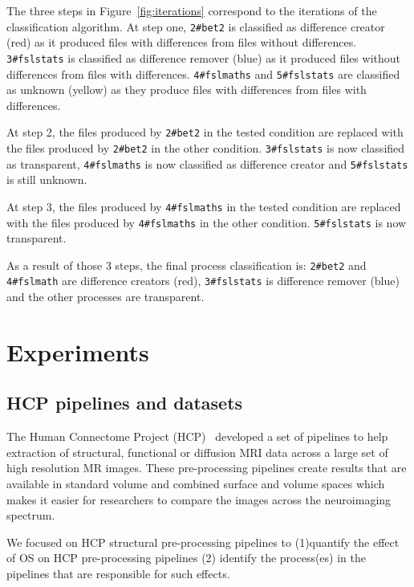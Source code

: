 \documentclass[a4paper,num-refs]{oup-contemporary}
\begin{document}
The three steps in Figure~\ref{fig:iterations} correspond to the 
iterations of the classification algorithm. At step one, \texttt{2\#bet2} 
is classified as difference creator (red) as it produced files with differences 
from files without differences. \texttt{3\#fslstats} is classified as difference  
remover (blue) as it produced files without differences from files with 
differences. \texttt{4\#fslmaths} and \texttt{5\#fslstats} are classified as 
unknown (yellow) as they produce files with differences from files with 
differences.

At step 2, the files produced by \texttt{2\#bet2} in the tested 
condition are replaced with the files produced by \texttt{2\#bet2} in 
the other condition. \texttt{3\#fslstats} is now classified as 
transparent, \texttt{4\#fslmaths} is now classified as difference creator 
and \texttt{5\#fslstats} is still unknown.

At step 3, the files produced by \texttt{4\#fslmaths} in the tested 
condition are replaced with the files produced by \texttt{4\#fslmaths} 
in the other condition. \texttt{5\#fslstats} is now transparent.
 
As a result of those 3 steps, the final process classification is: 
\texttt{2\#bet2} and \texttt{4\#fslmath} are difference creators (red), 
\texttt{3\#fslstats} is difference remover (blue) and the other processes 
are transparent.


\section{Experiments}

\subsection{HCP pipelines and datasets}

The Human Connectome Project (HCP)~\cite{glasser2013minimal} developed 
a set of pipelines to help extraction of structural, functional or 
diffusion MRI data across a large set of high resolution MR images. 
These pre-processing pipelines create results that are available in 
standard volume and combined surface and volume spaces which makes it 
easier for researchers to compare the images across the neuroimaging 
spectrum. 

We focused on HCP structural pre-processing pipelines to (1)quantify 
the effect of OS on HCP pre-processing pipelines (2) identify the 
process(es) in the pipelines that are responsible for such effects.
\end{document}
